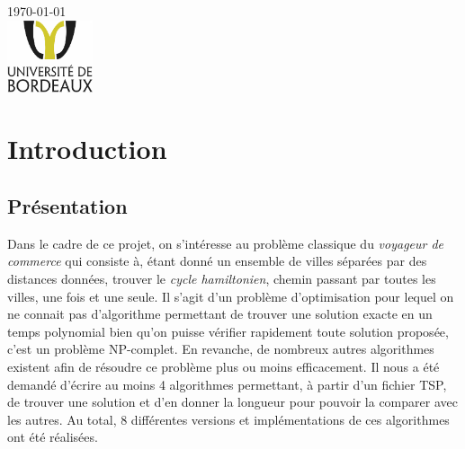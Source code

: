 \documentclass[12pt]{report}
\begin{document}
\begin{titlepage}
{\large \today}\\[1.5cm] %


\includegraphics[height=80px]{bxlogo.jpg}\\[1cm] %
 

\vfill 

\end{titlepage}





\tableofcontents




\chapter{Introduction}


\section{Présentation}
Dans le cadre de ce projet, on s'intéresse au problème classique du \textit{voyageur de commerce} qui consiste à, étant donné un ensemble de villes séparées par des distances données, trouver le \textit{cycle hamiltonien}, chemin passant par toutes les villes, une fois et une seule. Il s'agit d'un problème d'optimisation pour lequel on ne connait pas d'algorithme permettant de trouver une solution exacte en un temps polynomial bien qu'on puisse vérifier rapidement toute solution proposée, c'est un problème NP-complet. En revanche, de nombreux autres algorithmes existent afin de résoudre ce problème plus ou moins efficacement. Il nous a été demandé d'écrire au moins 4 algorithmes permettant, à partir d'un fichier TSP, de trouver une solution et d'en donner la longueur pour pouvoir la comparer avec les autres. Au total, 8 différentes versions et implémentations de ces algorithmes ont été réalisées.\\
\end{document}

